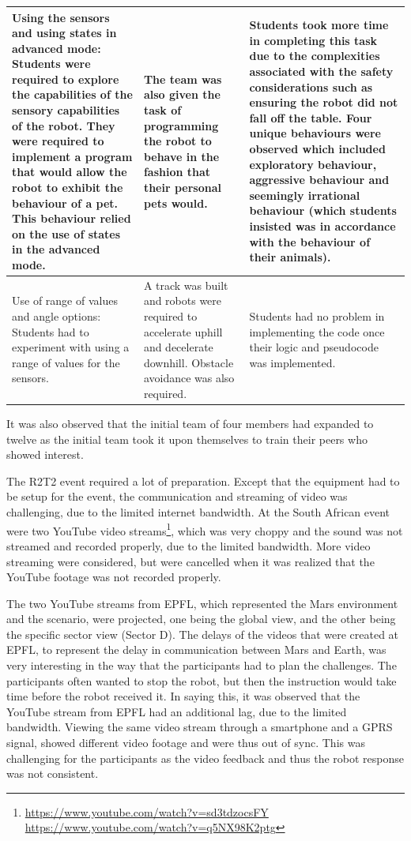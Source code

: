 \documentclass{intech-journal}
\begin{document}
\begin{table}
\begin{tabular}{|p{5cm}|p{5cm}|p{5cm}|}
Using the sensors and using states in advanced mode: Students were required to explore the capabilities of the sensory capabilities of the robot. They were required to implement a program that would allow the robot to exhibit the behaviour of a pet. This behaviour relied on the use of states in the advanced mode. &
The team was also given the task of programming the robot to behave in the fashion that their personal pets would.  &
Students took more time in completing this task due to the complexities associated with the safety considerations such as ensuring the robot did not fall off the table. Four unique behaviours were observed which included exploratory behaviour, aggressive behaviour and seemingly irrational behaviour (which students insisted was in accordance with the behaviour of their animals). \\\hline
Use of range of values and angle options: Students had to experiment with using a range of values for the sensors. &
A track was built and robots were required to accelerate uphill and decelerate downhill. Obstacle avoidance was also required.  &
Students had no problem in implementing the code once their logic and pseudocode was implemented. \\\hline

\end{tabular}

\end{table}



It was also observed that the initial team of four members had expanded to twelve as the initial team took it upon themselves to train their peers who showed interest. 

The R2T2 event required a lot of preparation. Except that the equipment had to be setup for the event, the communication and streaming of video was challenging, due to the limited internet bandwidth. At the South African event were two YouTube video streams\footnote{\url{https://www.youtube.com/watch?v=sd3tdzocsFY} \\ \url{https://www.youtube.com/watch?v=q5NX98K2ptg}}, which was very choppy and the sound was not streamed and recorded properly, due to the limited bandwidth. More video streaming were considered, but were cancelled when it was realized that the YouTube footage was not recorded properly.

The two YouTube streams from EPFL, which represented the Mars environment and the scenario, were projected, one being the global view, and the other being the specific sector view (Sector D). The delays of the videos that were created at EPFL, to represent the delay in communication between Mars and Earth, was very interesting in the way that the participants had to plan the challenges. The participants often wanted to stop the robot, but then the instruction would take time before the robot received it. In saying this, it was observed that the YouTube stream from EPFL had an additional lag, due to the limited bandwidth. Viewing the same video stream through a smartphone and a GPRS signal, showed different video footage and were thus out of sync. This was challenging for the participants as the video feedback and thus the robot response was not consistent.
\end{document}
